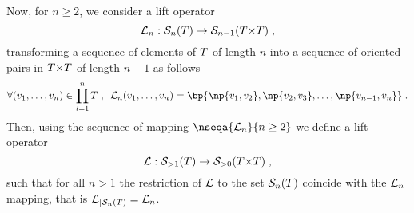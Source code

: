 \documentclass[12pt]{article}
\begin{document}
Now, for $n\ge 2$, we consider a lift operator
\[{\cal L}_n: {\cal S}_{n}(T)\to {\cal S}_{n{-}1}(T{\times}T)\; ,\]
transforming a sequence of elements of
$T$ of length $n$
into a sequence of oriented pairs in $T{\times}T$ of length $n{-}1$ as follows 
\begin{align}
  \forall (\vertex_1,\dots, \vertex_n)\in \SetProd{\fullset}{n}
  \eqsepv
  \Lift_n(\vertex_1,\dots, \vertex_n) = \bp{\np{\vertex_1, \vertex_2},\np{\vertex_2, \vertex_3},\dots,
  \np{\vertex_{n-1},\vertex_n}}
  \eqfinp
\end{align}
Then, using the sequence of mapping $\nseqa{\Lift_n}{n\ge 2}$ we define a lift operator
\[ {\cal L}: {\cal S}_{> 1}(T) \to {\cal S}_{> 0}(T{\times}T)
  \; ,\] such that for all $n > 1$ the restriction of ${\cal L}$ to the set
${\cal S}_{n}(T)$ coincide with the ${\cal L}_n$ mapping, that is
${{\cal L}}_{\vert{\cal S}_n(T)}= {\cal L}_n$.
\end{document}
